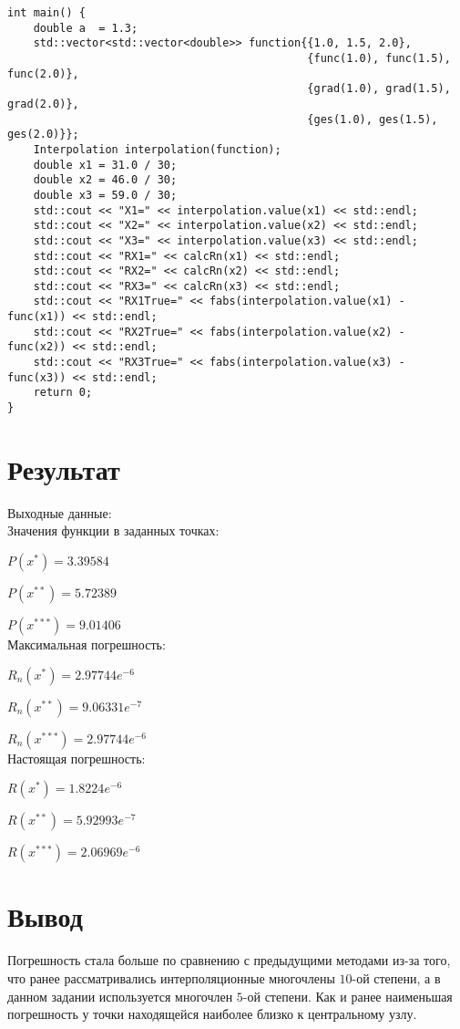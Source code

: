 \documentclass[10pt]{scrartcl}
\begin{document}
\begin{verbatim}
int main() {
    double a  = 1.3;
    std::vector<std::vector<double>> function{{1.0, 1.5, 2.0},
                                              {func(1.0), func(1.5), func(2.0)},
                                              {grad(1.0), grad(1.5), grad(2.0)},
                                              {ges(1.0), ges(1.5), ges(2.0)}};
    Interpolation interpolation(function);
    double x1 = 31.0 / 30;
    double x2 = 46.0 / 30;
    double x3 = 59.0 / 30;
    std::cout << "X1=" << interpolation.value(x1) << std::endl;
    std::cout << "X2=" << interpolation.value(x2) << std::endl;
    std::cout << "X3=" << interpolation.value(x3) << std::endl;
    std::cout << "RX1=" << calcRn(x1) << std::endl;
    std::cout << "RX2=" << calcRn(x2) << std::endl;
    std::cout << "RX3=" << calcRn(x3) << std::endl;
    std::cout << "RX1True=" << fabs(interpolation.value(x1) - func(x1)) << std::endl;
    std::cout << "RX2True=" << fabs(interpolation.value(x2) - func(x2)) << std::endl;
    std::cout << "RX3True=" << fabs(interpolation.value(x3) - func(x3)) << std::endl;
    return 0;
}
\end{verbatim}
\section*{Результат}\noindent
Выходные данные:\\
Значения функции в заданных точках:

$P(x^*)=3.39584$

$P(x^{**})=5.72389$

$P(x^{***})=9.01406$\\
Максимальная погрешность:

$R_n(x^*)=2.97744e^{-6}$

$R_n(x^{**})=9.06331e^{-7}$

$R_n(x^{***})=2.97744e^{-6}$\\
Настоящая погрешность:

$R(x^*)=1.8224e^{-6}$

$R(x^{**})=5.92993e^{-7}$

$R(x^{***})=2.06969e^{-6}$
\section*{Вывод}\noindent
Погрешность стала больше по сравнению с предыдущими методами из-за того, что ранее
рассматривались интерполяционные многочлены $10$-ой степени, а в данном задании 
используется многочлен $5$-ой степени. Как и ранее наименьшая погрешность у точки
находящейся наиболее близко к центральному узлу.
\end{document}
